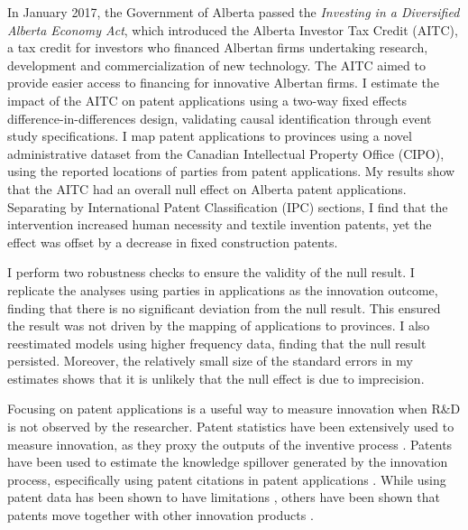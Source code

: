 \documentclass[../main.tex]{subfiles}
\begin{document}
In January 2017, the Government of Alberta passed the \textit{Investing in a Diversified Alberta Economy Act}, which introduced the Alberta Investor Tax Credit (AITC), a tax credit for investors who financed Albertan firms undertaking research, development and commercialization of new technology. The AITC aimed to provide easier access to financing for innovative Albertan firms. I estimate the impact of the AITC on patent applications using a two-way fixed effects difference-in-differences design, validating causal identification through event study specifications. I map patent applications to provinces using a novel administrative dataset from the Canadian Intellectual Property Office (CIPO), using the reported locations of parties from patent applications. My results show that the AITC had an overall null effect on Alberta patent applications. Separating by International Patent Classification (IPC) sections, I find that the intervention increased human necessity and textile invention patents, yet the effect was offset by a decrease in fixed construction patents. 

I perform two robustness checks to ensure the validity of the null result. I replicate the analyses using parties in applications as the innovation outcome, finding that there is no significant deviation from the null result. This ensured the result was not driven by the mapping of applications to provinces. I also reestimated models using higher frequency data, finding that the null result persisted. Moreover, the relatively small size of the standard errors in my estimates shows that it is unlikely that the null effect is due to imprecision.

Focusing on patent applications is a useful way to measure innovation when R\&D is not observed by the researcher. Patent statistics have been extensively used to measure innovation, as they proxy the outputs of the inventive process \parencite{nordhaus69, pavitt85,trajtenberg90,artz_etal10}. Patents have been used to estimate the knowledge spillover generated by the innovation process, especifically using patent citations in patent applications \parencite{trajtenberg90,jaffe_etal93}. While using patent data has been shown to have limitations \parencite{lanjouw_etal98a}, others have been shown that patents move together with other innovation products \parencite{lanjouw_schankerman04}.
\end{document}
